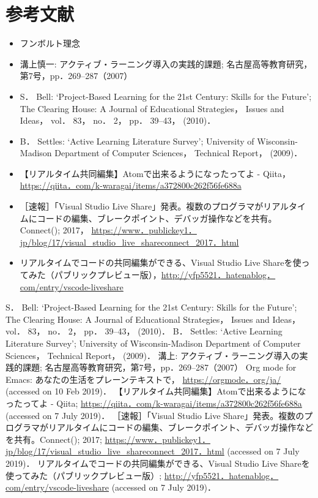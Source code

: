\documentclass{hissymp}
\begin{document}
\section{参考文献}
\label{sec:orgeb28273}
\begin{itemize}
\item\relax [潮木] フンボルト理念
\item\relax [溝上慎一， 2007]
溝上慎一: アクティブ・ラーニング導入の実践的課題; 名古屋高等教育研究，第7号，pp．269--287（2007）
\item\relax [Bell， 2010]
S． Bell: ‘Project-Based Learning for the 21st Century: Skills for the Future’; The Clearing House: A Journal of Educational Strategies， Issues and Ideas， vol． 83， no． 2， pp． 39–43， (2010)．
\item\relax [Settles， 2009]
B． Settles: ‘Active Learning Literature Survey’; University of Wisconsin-Madison Department of Computer Sciences， Technical Report， (2009)．
\item\relax [Atom]【リアルタイム共同編集】Atomで出来るようになったってよ - Qiita， \url{https://qiita．com/k-waragai/items/a372800c262f56fe688a}
\item\relax [VSC] ［速報］「Visual Studio Live Share」発表。複数のプログラマがリアルタイムにコードの編集、ブレークポイント、デバッガ操作などを共有。Connect(); 2017， \url{https://www．publickey1．jp/blog/17/visual\_studio\_live\_shareconnect\_2017．html}
\item\relax [VSCReview] リアルタイムでコードの共同編集ができる、Visual Studio Live Shareを使ってみた（パブリックプレビュー版），\url{http://yfp5521．hatenablog．com/entry/vscode-liveshare}
\end{itemize}

\begin{thebibliography}{7}

 S． Bell: ‘Project-Based Learning for the 21st Century: Skills for the Future’; The Clearing House: A Journal of Educational Strategies， Issues and Ideas， vol． 83， no． 2， pp． 39–43， (2010)．
 B． Settles: ‘Active Learning Literature Survey’; University of Wisconsin-Madison Department of Computer Sciences， Technical Report， (2009)．
 溝上: アクティブ・ラーニング導入の実践的課題; 名古屋高等教育研究，第7号，pp．269--287（2007）
 Org mode for Emacs: あなたの生活をプレーンテキストで， \url{https://orgmode．org/ja/} (accessed on 10 Feb 2019)．
 【リアルタイム共同編集】Atomで出来るようになったってよ - Qiita; \url{https://qiita．com/k-waragai/items/a372800c262f56fe688a} (accessed on 7 July 2019)．
  ［速報］「Visual Studio Live Share」発表。複数のプログラマがリアルタイムにコードの編集、ブレークポイント、デバッガ操作などを共有。Connect(); 2017; \url{https://www．publickey1．jp/blog/17/visual_studio_live_shareconnect_2017．html} (accessed on 7 July 2019)．
 リアルタイムでコードの共同編集ができる、Visual Studio Live Shareを使ってみた（パブリックプレビュー版）; \url{http://yfp5521．hatenablog．com/entry/vscode-liveshare} (accessed on 7 July 2019)．
\end{thebibliography}
\end{document}
